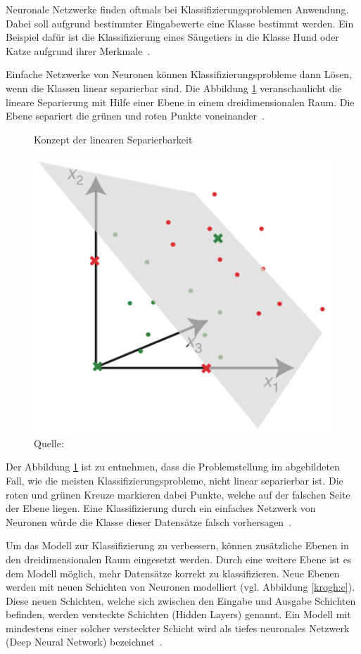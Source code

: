 Neuronale Netzwerke finden oftmals bei Klassifizierungsproblemen Anwendung. Dabei soll aufgrund bestimmter Eingabewerte eine Klasse bestimmt werden. Ein Beispiel dafür ist die Klassifizierung eines Säugetiers in die Klasse Hund oder Katze aufgrund ihrer Merkmale~\autocite{Krogh2008}.

Einfache Netzwerke von Neuronen können Klassifizierungsprobleme dann Lösen, wenn die Klassen linear separierbar sind. Die Abbildung \ref{krogh:b} veranschaulicht die lineare Separierung mit Hilfe einer Ebene in einem dreidimensionalen Raum. Die Ebene separiert die grünen und roten Punkte voneinander~\autocite{Krogh2008}.

\begin{figure}[h!]
    \captionsetup{width=.9\linewidth}
    \caption{Konzept der linearen Separierbarkeit}
    \label{krogh:b}
    \centering
    \includegraphics[width=0.4\linewidth]{graphics/krogh/krogh_plane.png}
    \caption*{Quelle: \textcite{Krogh2008}}
\end{figure}

Der Abbildung \ref{krogh:b} ist zu entnehmen, dass die Problemstellung im abgebildeten Fall, wie die meisten Klassifizierungsprobleme, nicht linear separierbar ist. Die roten und grünen Kreuze markieren dabei Punkte, welche auf der falschen Seite der Ebene liegen. Eine Klassifizierung durch ein einfaches Netzwerk von Neuronen würde die Klasse dieser Datensätze falsch vorhersagen~\autocite{Krogh2008}.

Um das Modell zur Klassifizierung zu verbessern, können zusätzliche Ebenen in den dreidimensionalen Raum eingesetzt werden. Durch eine weitere Ebene ist es dem Modell möglich, mehr Datensätze korrekt zu klassifizieren. Neue Ebenen werden mit neuen Schichten von Neuronen modelliert (vgl. Abbildung \ref{krogh:c}). Diese neuen Schichten, welche sich zwischen den Eingabe und Ausgabe Schichten befinden, werden versteckte Schichten (Hidden Layers) genannt. Ein Modell mit mindestens einer solcher versteckter Schicht wird als tiefes neuronales Netzwerk (Deep Neural Network) bezeichnet~\autocite{Krogh2008}.

